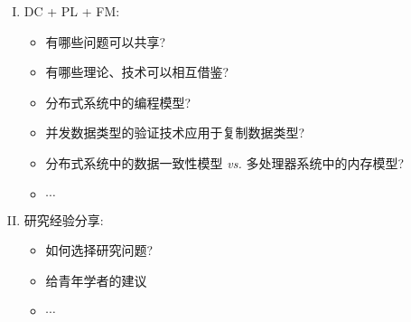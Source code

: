 
\begin{frame}[noframenumbering]
  \begin{enumerate}[(I)]
    \setlength{\itemsep}{15pt}
    \item {\large DC + PL + FM:}
      \begin{itemize}
	\setlength{\itemsep}{6pt}
	\item 有哪些问题可以共享?
	\item 有哪些理论、技术可以相互借鉴?
	\item 分布式系统中的编程模型?
	\item 并发数据类型的验证技术应用于复制数据类型?
	\item 分布式系统中的数据一致性模型 \emph{vs.} 多处理器系统中的内存模型?
	\item $\cdots$
      \end{itemize}
    \item {研究经验分享:}
      \begin{itemize}
	\setlength{\itemsep}{6pt}
	\item 如何选择研究问题?
	\item 给青年学者的建议
	\item $\cdots$
      \end{itemize}
  \end{enumerate}
\end{frame}
